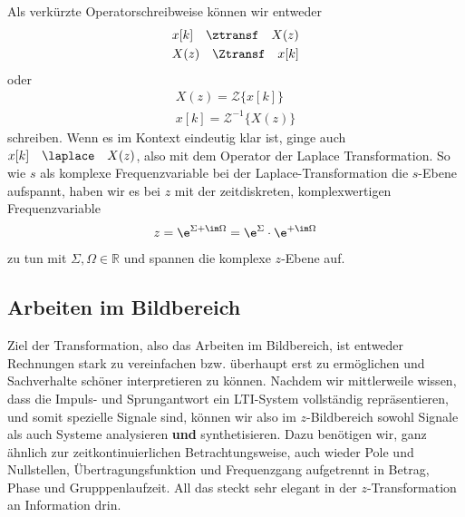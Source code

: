 Als verkürzte Operatorschreibweise können wir entweder
\begin{align}
x[k] \quad\ztransf\quad X(z)\\
X(z) \quad\Ztransf\quad x[k]
\end{align}
oder
\begin{align}
X(z) = \mathcal{Z}\{x[k]\} \\
x[k] = \mathcal{Z}^{-1}\{X(z)\}
\end{align}
schreiben.
Wenn es im Kontext eindeutig klar ist, ginge auch $x[k] \quad\laplace\quad X(z)$,
also mit dem Operator der Laplace Transformation.
%
So wie $s$ als komplexe Frequenzvariable bei der Laplace-Transformation die
$s$-Ebene aufspannt, haben wir es bei $z$ mit der zeitdiskreten, komplexwertigen
Frequenzvariable
\begin{align}
z = \e^{\Sigma + \im \Omega} = \e^{\Sigma} \cdot \e^{+\im \Omega}
\end{align}
zu tun mit $\Sigma,\Omega\in\mathbb{R}$ und spannen die komplexe $z$-Ebene auf.
%
\subsection*{Arbeiten im Bildbereich}
Ziel der Transformation, also das Arbeiten im Bildbereich, ist
entweder Rechnungen stark zu vereinfachen bzw. überhaupt erst zu ermöglichen und
Sachverhalte schöner interpretieren zu können.
%
Nachdem wir mittlerweile wissen, dass die Impuls- und Sprungantwort ein LTI-System
vollständig repräsentieren, und somit spezielle
Signale sind, können wir also im $z$-Bildbereich sowohl Signale als auch Systeme
analysieren \textbf{und} synthetisieren.
%
Dazu benötigen wir, ganz ähnlich zur zeitkontinuierlichen Betrachtungsweise, auch
wieder Pole und Nullstellen, Übertragungsfunktion und Frequenzgang aufgetrennt
in Betrag, Phase und Grupppenlaufzeit.
%
All das steckt sehr elegant in der $z$-Transformation an Information drin.
%
